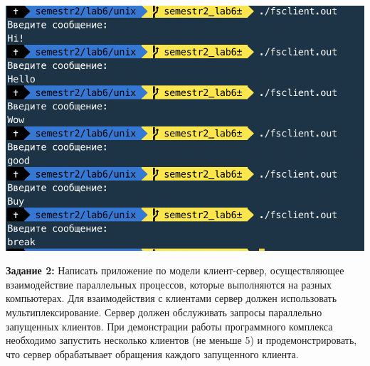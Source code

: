 \documentclass[a4paper,14pt]{extreport} %
\begin{document}
\includegraphics{client1}

\newpage

\textbf{Задание 2:} Написать приложение по модели клиент-сервер, осуществляющее взаимодействие параллельных процессов, которые выполняются на разных компьютерах. Для взаимодействия с клиентами сервер должен использовать мультиплексирование. Сервер должен обслуживать запросы параллельно запущенных клиентов. При демонстрации работы программного комплекса необходимо запустить несколько клиентов (не меньше 5) и продемонстрировать, что сервер обрабатывает обращения каждого запущенного клиента.
\end{document}
